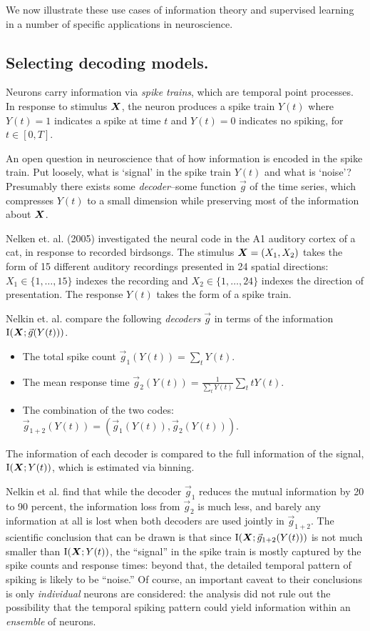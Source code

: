 We now illustrate these use cases of information theory and supervised
learning in a number of specific applications in neuroscience.

\subsection{Selecting decoding models.}
Neurons carry information via \emph{spike trains}, which are temporal
point processes.  In response to stimulus $\boldsymbol{X}$, the neuron produces a
spike train $Y(t)$ where $Y(t) = 1$ indicates a spike at time $t$ and
$Y(t) = 0$ indicates no spiking, for $t \in [0, T]$.

An open question in neuroscience that of how information is encoded in
the spike train.  Put loosely, what is `signal' in the spike train
$Y(t)$ and what is `noise'?  Presumably there exists
some \emph{decoder}--some function $\vec{g}$ of the time series, which
compresses $Y(t)$ to a small dimension while preserving most of the
information about $\boldsymbol{X}$.

Nelken et. al. (2005) investigated the neural code in the A1 auditory
cortex of a cat, in response to recorded birdsongs.  The stimulus $\boldsymbol{X}
= (X_1, X_2)$ takes the form of 15 different auditory recordings
presented in 24 spatial directions: $X_1 \in \{1,\hdots, 15\}$ indexes
the recording and $X_2 \in \{1,\hdots, 24\}$ indexes the direction of
presentation.  The response $Y(t)$ takes the form of a spike train.

Nelkin et. al. compare the following \emph{decoders} $\vec{g}$ in terms
of the information $\text{I}(\boldsymbol{X}; \vec{g}(Y(t)))$.
\begin{itemize}
\item The total spike count $\vec{g}_1(Y(t)) = \sum_t Y(t)$.
\item The mean response time $\vec{g}_2(Y(t)) = \frac{1}{\sum_t Y(t)} \sum_t t Y(t)$.
\item The combination of the two codes: $\vec{g}_{1+2}(Y(t)) = (\vec{g}_1(Y(t)), \vec{g}_2(Y(t)))$.
\end{itemize}
The information of each decoder is compared to the full information of
the signal, $\text{I}(\boldsymbol{X}; Y(t))$, which is estimated via binning.

Nelkin et al. find that while the decoder $\vec{g}_1$ reduces the
mutual information by 20 to 90 percent, the information loss from
$\vec{g}_2$ is much less, and barely any information at all is lost
when both decoders are used jointly in $\vec{g}_{1+2}$.  The
scientific conclusion that can be drawn is that since
$\text{I}(\boldsymbol{X}; \vec{g}_{1+2}(Y(t)))$ is not much smaller than
$\text{I}(\boldsymbol{X}; Y(t))$, the ``signal'' in the spike train is mostly
captured by the spike counts and response times: beyond that, the
detailed temporal pattern of spiking is likely to be ``noise.''  Of
course, an important caveat to their conclusions is
only \emph{individual} neurons are considered: the analysis did not
rule out the possibility that the temporal spiking pattern could yield
information within an \emph{ensemble} of neurons.

